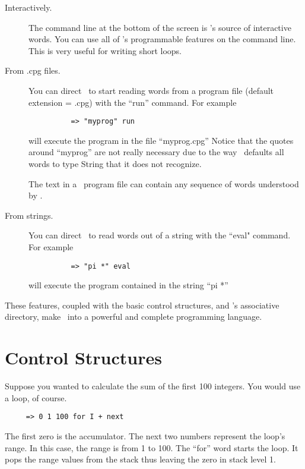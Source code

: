 \documentclass{report}
\begin{document}
\begin{description}
  
\item[Interactively.] The command line at the bottom of the screen is \CLAC's source of
  interactive words. You can use all of \CLAC's programmable features on the command line. This
  is very useful for writing short loops.
  
\item[From .cpg files.] You can direct \CLAC\ to start reading words from a program file
  (default extension = .cpg) with the ``run'' command. For example

\begin{verbatim}
          => "myprog" run
\end{verbatim}
  
  will execute the program in the file ``myprog.cpg'' Notice that the quotes around ``myprog''
  are not really necessary due to the way \CLAC\ defaults all words to type String that it does
  not recognize.
  
  The text in a \CLAC\ program file can contain any sequence of words understood by \CLAC.
  
\item[From strings.] You can direct \CLAC\ to read words out of a string with the ``eval"
  command. For example

\begin{verbatim}
          => "pi *" eval
\end{verbatim}

     will execute the program contained in the string ``pi *''

\end{description}

These features, coupled with the basic control structures, and \CLAC's associative directory,
make \CLAC\ into a powerful and complete programming language.

\section{Control Structures}

Suppose you wanted to calculate the sum of the first 100 integers. You would use a loop, of
course.

\begin{verbatim}
     => 0 1 100 for I + next
\end{verbatim}

The first zero is the accumulator. The next two numbers represent the loop's range. In this
case, the range is from 1 to 100. The ``for'' word starts the loop. It pops the range values
from the stack thus leaving the zero in stack level 1.
\end{document}
